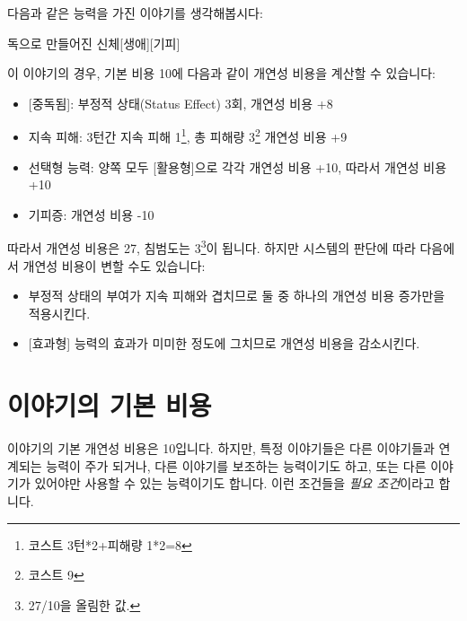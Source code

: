 \documentclass{report}
\begin{document}
	다음과 같은 능력을 가진 이야기를 생각해봅시다:
	\begin{story}{독으로 만들어진 신체}{[생애][기피]}
		
		
	\end{story}
	이 이야기의 경우, 기본 비용 10에 다음과 같이 개연성 비용을 계산할 수 있습니다:
	\begin{itemize}
		\item {}[중독됨]: 부정적 상태(Status Effect) 3회, 개연성 비용 +8
		\item 지속 피해: 3턴간 지속 피해 1\footnote{코스트 3턴*2+피해량 1*2=8}, 총 피해량 3\footnote{코스트 9} 개연성 비용 +9
		\item 선택형 능력: 양쪽 모두 [활용형]으로 각각 개연성 비용 +10, 따라서 개연성 비용 +10
		\item 기피증: 개연성 비용 -10
	\end{itemize}
	따라서 개연성 비용은 27, 침범도는 3\footnote{27/10을 올림한 값.}이 됩니다. 하지만 시스템의 판단에 따라 다음에서 개연성 비용이 변할 수도 있습니다:
	\begin{itemize}
		\item 부정적 상태의 부여가 지속 피해와 겹치므로 둘 중 하나의 개연성 비용 증가만을 적용시킨다.
		\item {}[효과형] 능력의 효과가 미미한 정도에 그치므로 개연성 비용을 감소시킨다.
	\end{itemize}
	
	\section*{이야기의 기본 비용}
	이야기의 기본 개연성 비용은 10입니다. 하지만, 특정 이야기들은 다른 이야기들과 연계되는 능력이 주가 되거나, 다른 이야기를 보조하는 능력이기도 하고, 또는 다른 이야기가 있어야만 사용할 수 있는 능력이기도 합니다. 이런 조건들을 \emph{필요 조건}이라고 합니다.
	
\end{document}
